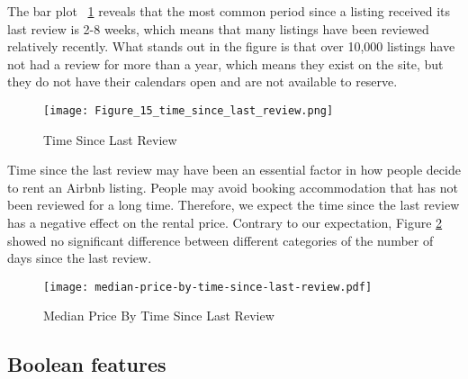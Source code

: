 The bar plot ~\ref{fig:time_since_last_review} reveals that the most
common period since a listing received its last review is 2-8 weeks, which means
that many listings have been reviewed relatively recently.  What stands out in
the figure is that over 10,000 listings have not had a review for more than a
year, which means they exist on the site, but they do not have their calendars
open and are not available to reserve.

\begin{figure}[!htbp]\centering
    \texttt{[image: Figure\_15\_time\_since\_last\_review.png]}
    \caption{Time Since Last Review}
    \label{fig:time_since_last_review}
\end{figure}

Time since the last review may have been an essential factor in how people
decide to rent an Airbnb listing. People may avoid booking accommodation that
has not been reviewed for a long time. Therefore, we expect the time since the
last review has a negative effect on the rental price. Contrary to our
expectation, Figure \ref{fig:time_since_last_review_price} showed no significant
difference between different categories of the number of days since the last
review.

\begin{figure}[!htbp]\centering
    \texttt{[image: median-price-by-time-since-last-review.pdf]}
        \caption{Median Price By Time Since Last Review}
        \label{fig:time_since_last_review_price}
\end{figure}


\subsection{Boolean features}
\label{sec:boolean_features}

